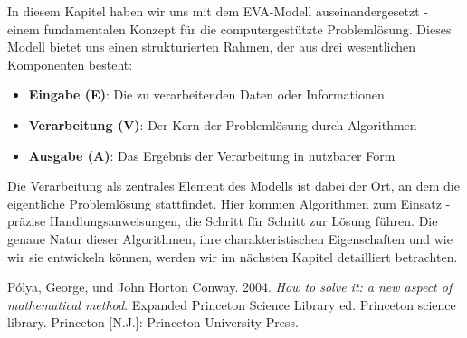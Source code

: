 \documentclass[
  ngerman,
  letterpaper,
  DIV=11]{scrreprt}
\newlength{\cslhangindent}
\newenvironment{CSLReferences}[2] %
 {\begin{list}{}{%
  \setlength{\itemindent}{0pt}
  \setlength{\leftmargin}{0pt}
  \setlength{\parsep}{0pt}
  \ifodd #1
   \setlength{\leftmargin}{\cslhangindent}
   \setlength{\itemindent}{-1\cslhangindent}
  \fi
  \setlength{\itemsep}{#2\baselineskip}}}
 {\end{list}}
\providecommand{\tightlist}{%
  \setlength{\itemsep}{0pt}\setlength{\parskip}{0pt}}
\begin{document}
In diesem Kapitel haben wir uns mit dem EVA-Modell auseinandergesetzt -
einem fundamentalen Konzept für die computergestützte Problemlösung.
Dieses Modell bietet uns einen strukturierten Rahmen, der aus drei
wesentlichen Komponenten besteht:

\begin{itemize}
\tightlist
\item
  \textbf{Eingabe (E)}: Die zu verarbeitenden Daten oder Informationen
\item
  \textbf{Verarbeitung (V)}: Der Kern der Problemlösung durch
  Algorithmen
\item
  \textbf{Ausgabe (A)}: Das Ergebnis der Verarbeitung in nutzbarer Form
\end{itemize}

Die Verarbeitung als zentrales Element des Modells ist dabei der Ort, an
dem die eigentliche Problemlösung stattfindet. Hier kommen Algorithmen
zum Einsatz - präzise Handlungsanweisungen, die Schritt für Schritt zur
Lösung führen. Die genaue Natur dieser Algorithmen, ihre
charakteristischen Eigenschaften und wie wir sie entwickeln können,
werden wir im nächsten Kapitel detailliert betrachten.

\label{refs}
\begin{CSLReferences}{1}{0}
Pólya, George, und John Horton Conway. 2004. \emph{How to solve it: a
new aspect of mathematical method}. Expanded Princeton Science Library
ed. Princeton science library. Princeton {[}N.J.{]}: Princeton
University Press.

\end{CSLReferences}
\end{document}
